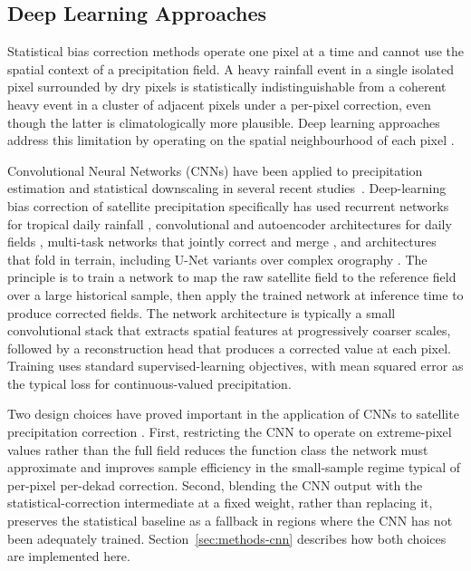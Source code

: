 \subsection{Deep Learning Approaches}\label{sec:lit-dl}

Statistical bias correction methods operate one pixel at a time
and cannot use the spatial context of a precipitation field. A
heavy rainfall event in a single isolated pixel surrounded by
dry pixels is statistically indistinguishable from a coherent
heavy event in a cluster of adjacent pixels under a per-pixel
correction, even though the latter is climatologically more
plausible. Deep learning approaches address this limitation by
operating on the spatial neighbourhood of each pixel
\citep{ref:reichstein2019}.

Convolutional Neural Networks (CNNs) have been applied to
precipitation estimation and statistical downscaling in several
recent studies~\citep{ref:pan2019, ref:banomedina2020}.
Deep-learning bias correction of satellite precipitation
specifically has used recurrent networks for tropical daily
rainfall \citep{ref:yang2022}, convolutional and autoencoder
architectures for daily fields \citep{ref:le2020}, multi-task
networks that jointly correct and merge \citep{ref:jiao2025}, and
architectures that fold in terrain, including U-Net variants over
complex orography \citep{ref:dao2025}. The principle
is to train a network to map the raw satellite field to the
reference field over a large historical sample, then apply the
trained network at inference time to produce corrected fields.
The network architecture is typically a small convolutional
stack that extracts spatial features at progressively coarser
scales, followed by a reconstruction head that produces a
corrected value at each pixel. Training uses standard
supervised-learning objectives, with mean squared error as the
typical loss for continuous-valued precipitation.

Two design choices have proved important in the application of
CNNs to satellite precipitation correction \citep{ref:banomedina2020}. First, restricting
the CNN to operate on extreme-pixel values rather than the
full field reduces the function class the network must
approximate and improves sample efficiency in the small-sample
regime typical of per-pixel per-dekad correction. Second,
blending the CNN output with the statistical-correction
intermediate at a fixed weight, rather than replacing it,
preserves the statistical baseline as a fallback in regions
where the CNN has not been adequately trained.
Section~\ref{sec:methods-cnn} describes how both choices are
implemented here.

